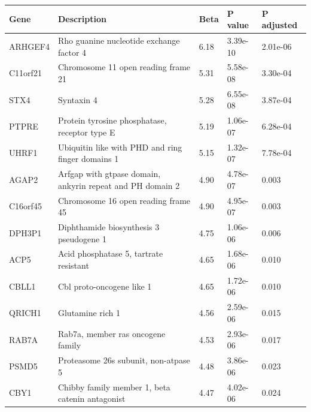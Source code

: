 \documentclass[10pt]{article}
\begin{document}
\begin{table}[]
\begin{tabular}{p{1.5cm}p{8cm}C{1cm}C{1.3cm}C{1.7cm}}
Gene     & Description                                                & Beta & P value & P adjusted \\
\hline
ARHGEF4  & Rho guanine nucleotide exchange factor 4                   & 6.18          & 3.39e-10      & 2.01e-06       \\
C11orf21 & Chromosome 11 open reading frame 21                        & 5.31          & 5.58e-08      & 3.30e-04       \\
STX4     & Syntaxin 4                                                 & 5.28          & 6.55e-08      & 3.87e-04       \\
PTPRE    & Protein tyrosine phosphatase, receptor type E              & 5.19          & 1.06e-07      & 6.28e-04       \\
UHRF1    & Ubiquitin like with PHD and ring finger domains 1          & 5.15          & 1.32e-07      & 7.78e-04       \\
AGAP2    & Arfgap with gtpase domain, ankyrin repeat and PH domain 2  & 4.90          & 4.78e-07      & 0.003          \\
C16orf45 & Chromosome 16 open reading frame 45                        & 4.90          & 4.95e-07      & 0.003          \\
DPH3P1   & Diphthamide biosynthesis 3 pseudogene 1                    & 4.75          & 1.06e-06      & 0.006          \\
ACP5     & Acid phosphatase 5, tartrate resistant                     & 4.65          & 1.68e-06      & 0.010          \\
CBLL1    & Cbl proto-oncogene like 1                                  & 4.65          & 1.72e-06      & 0.010          \\
QRICH1   & Glutamine rich 1                                           & 4.56          & 2.59e-06      & 0.015          \\
RAB7A    & Rab7a, member ras oncogene family                          & 4.53          & 2.93e-06      & 0.017          \\
PSMD5    & Proteasome 26s subunit, non-atpase 5                       & 4.48          & 3.86e-06      & 0.023          \\
CBY1     & Chibby family member 1, beta catenin antagonist            & 4.47          & 4.02e-06      & 0.024          \\

\end{tabular}
\end{table}
\end{document}
